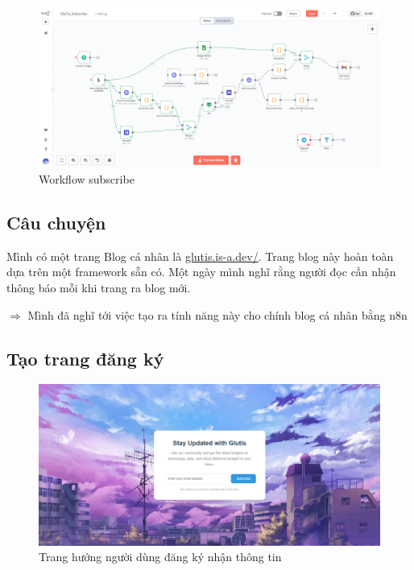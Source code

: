 \begin{figure}[htbp]
    \centering
    \includegraphics[width=1\linewidth]{Chap1-7/glutis-subscribe.pdf}
    \caption{Workflow subscribe}
\end{figure}


\subsection{Câu chuyện}
Mình có một trang Blog cá nhân là \href{https://glutis.is-a.dev/}{glutis.is-a.dev/}. Trang blog này hoàn toàn dựa trên một framework sẵn có. Một ngày mình nghĩ rằng người đọc cần nhận thông báo mỗi khi trang ra blog mới. 

$\Rightarrow$ Mình đã nghĩ tới việc tạo ra tính năng này cho chính blog cá nhân bằng n8n


\subsection{Tạo trang đăng ký}

\begin{figure}[htbp]
    \centering
    \includegraphics[width=1\linewidth]{Chap1-7/subscribe-page.pdf}
    \caption{Trang hướng người dùng đăng ký nhận thông tin}
\end{figure}

